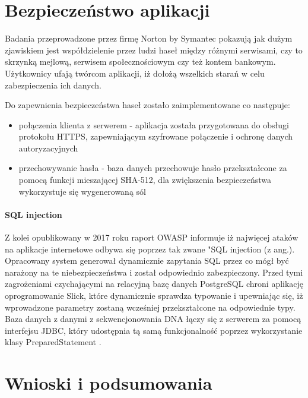 \documentclass[a4paper,12pt,twoside]{article}
\begin{document}
\section{Bezpieczeństwo aplikacji}  
Badania przeprowadzone przez firmę Norton by Symantec \cite{nortonSec}
pokazują jak dużym zjawiskiem jest współdzielenie przez ludzi haseł między różnymi serwisami, czy to
skrzynką mejlową, serwisem społecznościowym czy też kontem bankowym.
Użytkownicy ufają twórcom aplikacji, iż dołożą wszelkich starań w celu zabezpieczenia ich 
danych. 

Do zapewnienia bezpieczeństwa haseł zostało zaimplementowane co następuje:
\begin{itemize}
\item{połączenia klienta z serwerem} - aplikacja została przygotowana do obsługi protokołu HTTPS,
zapewniającym szyfrowane połączenie i ochronę danych autoryzacyjnych
\item{przechowywanie hasła - baza danych przechowuje hasło przekształcone za pomocą funkcji mieszającej SHA-512, dla zwiększenia bezpieczeństwa wykorzystuje się wygenerowaną sól 
}
\end{itemize}

\newpage
\paragraph{SQL injection} Z kolei opublikowany w 2017 roku raport OWASP \cite{owasp}
informuje iż najwięcej ataków na aplikacje internetowe odbywa się poprzez tak zwane "SQL injection (z ang.). 
Opracowany system generował dynamicznie zapytania SQL przez co mógł być narażony na te niebezpieczeństwa i został odpowiednio zabezpieczony.
Przed tymi zagrożeniami czychającymi na relacyjną bazę danych PostgreSQL chroni aplikację oprogramowanie Slick, które dynamicznie sprawdza typowanie i upewniając się, iż wprowadzone parametry
zostaną wcześniej przekształcone na odpowiednie typy.
Baza danych z danymi z sekwencjonowania DNA łączy się z serwerem za pomocą interfejsu JDBC,
który udostępnia tą samą funkcjonalność poprzez wykorzystanie klasy PreparedStatement \cite{preparedStatement}.

\newpage
\section{Wnioski i podsumowania}  
\end{document}

